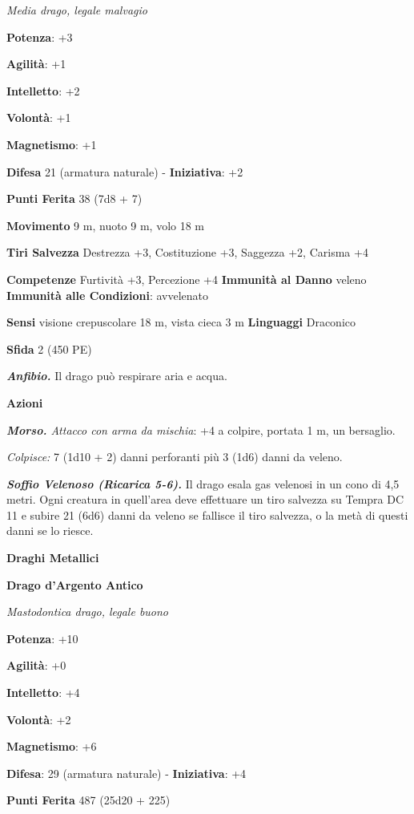 \begin{multicols}{2}
\emph{Media drago, legale malvagio}

\textbf{Potenza}: +3

\textbf{Agilità}: +1

\textbf{Intelletto}: +2

\textbf{Volontà}: +1

\textbf{Magnetismo}: +1

\textbf{Difesa} 21 (armatura naturale) - \textbf{Iniziativa}: +2

\textbf{Punti Ferita} 38 (7d8 + 7)

\textbf{Movimento} 9 m, nuoto 9 m, volo 18 m

\textbf{Tiri Salvezza} Destrezza +3, Costituzione +3, Saggezza +2,
Carisma +4

\textbf{Competenze} Furtività +3, Percezione +4 \textbf{Immunità al Danno}
veleno \textbf{Immunità alle Condizioni}: avvelenato

\textbf{Sensi} visione crepuscolare 18 m, vista cieca 3 m
\textbf{Linguaggi} Draconico

\textbf{Sfida} 2 (450 PE)\smallskip

\emph{\textbf{Anfibio.}} Il drago può respirare aria e acqua.

\smallskip\textbf{Azioni}

\emph{\textbf{Morso.} Attacco con arma da mischia}: +4 a colpire,
portata 1 m, un bersaglio.

\emph{Colpisce:} 7 (1d10 + 2) danni perforanti più 3 (1d6) danni da
veleno.

\emph{\textbf{Soffio Velenoso (Ricarica 5-6).}} Il drago esala gas
velenosi in un cono di 4,5 metri. Ogni creatura in quell'area deve
effettuare un tiro salvezza su Tempra DC 11 e subire 21 (6d6)
danni da veleno se fallisce il tiro salvezza, o la metà di questi danni
se lo riesce.

\textbf{Draghi Metallici}

\textbf{Drago d'Argento Antico}

\emph{Mastodontica drago, legale buono}

\textbf{Potenza}: +10

\textbf{Agilità}: +0

\textbf{Intelletto}: +4

\textbf{Volontà}: +2

\textbf{Magnetismo}: +6

\textbf{Difesa}: 29 (armatura naturale) - \textbf{Iniziativa}: +4

\textbf{Punti Ferita} 487 (25d20 + 225) 


\end{multicols}

